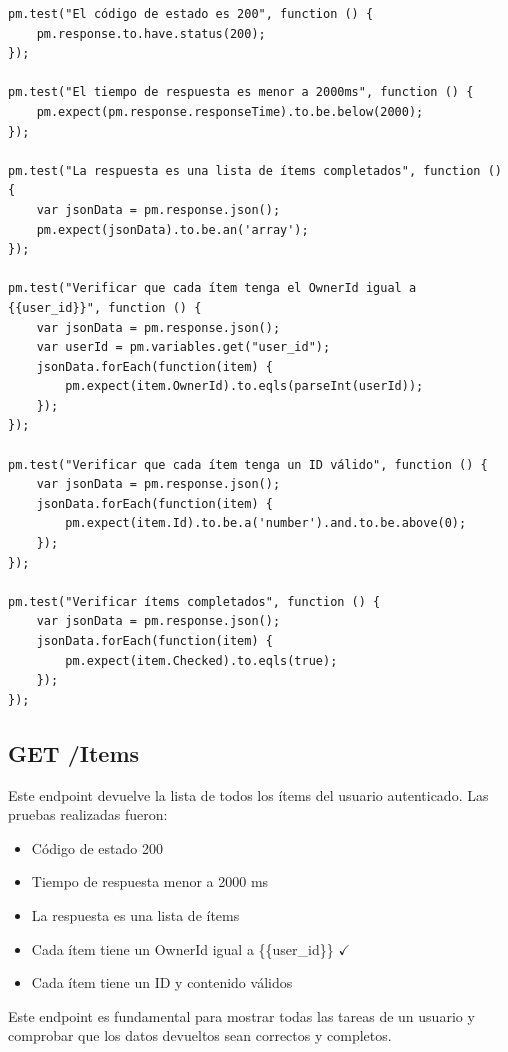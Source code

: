 \documentclass{report}
\begin{document}
\begin{lstlisting}
pm.test("El código de estado es 200", function () {
    pm.response.to.have.status(200);
});

pm.test("El tiempo de respuesta es menor a 2000ms", function () {
    pm.expect(pm.response.responseTime).to.be.below(2000);
});

pm.test("La respuesta es una lista de ítems completados", function () {
    var jsonData = pm.response.json();
    pm.expect(jsonData).to.be.an('array');
});

pm.test("Verificar que cada ítem tenga el OwnerId igual a {{user_id}}", function () {
    var jsonData = pm.response.json();
    var userId = pm.variables.get("user_id");
    jsonData.forEach(function(item) {
        pm.expect(item.OwnerId).to.eqls(parseInt(userId));
    });
});

pm.test("Verificar que cada ítem tenga un ID válido", function () {
    var jsonData = pm.response.json();
    jsonData.forEach(function(item) {
        pm.expect(item.Id).to.be.a('number').and.to.be.above(0);
    });
});

pm.test("Verificar ítems completados", function () {
    var jsonData = pm.response.json();
    jsonData.forEach(function(item) {
        pm.expect(item.Checked).to.eqls(true);
    });
});
\end{lstlisting}

\subsection{GET /Items}
Este endpoint devuelve la lista de todos los ítems del usuario autenticado. Las pruebas realizadas fueron:
\begin{itemize}
    \item Código de estado 200 \checkmark
    \item Tiempo de respuesta menor a 2000 ms \checkmark
    \item La respuesta es una lista de ítems \checkmark
    \item Cada ítem tiene un OwnerId igual a \{\{user\_id\}\} $\checkmark$
    \item Cada ítem tiene un ID y contenido válidos \checkmark
\end{itemize}

Este endpoint es fundamental para mostrar todas las tareas de un usuario y comprobar que los datos devueltos sean correctos y completos.
\end{document}
